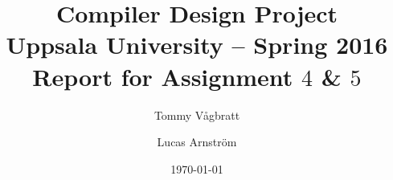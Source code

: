 \documentclass[a4paper,11pt]{article}
\title{\textbf{Compiler Design Project\\
  Uppsala University -- Spring 2016 \\
    Report for Assignment $4$ \& $5$}}
\author{Tommy Vågbratt \and Lucas Arnström}
\date{\today}
\begin{document}
\maketitle

\noindent


\end{document}

